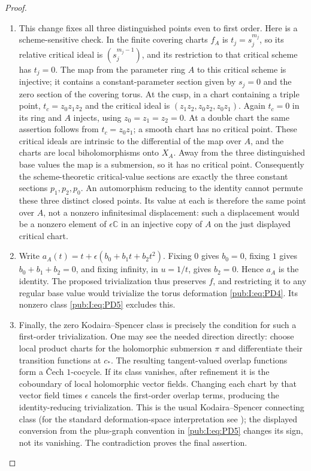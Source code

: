 \begin{proof}
\begin{enumerate}[label=\arabic*.,leftmargin=*]
\item This change fixes all three distinguished points even to first order.
Here is a scheme-sensitive check. In the finite covering charts
$f_A$ is $t_j=s_j^{m_j}$, so its relative critical ideal is
$(s_j^{m_j-1})$, and its restriction to that critical scheme has
$t_j=0$. The map from the parameter ring $A$ to this critical
scheme is injective; it contains a constant-parameter section given
by $s_j=0$ and the zero section of the covering torus.
At the cusp, in a chart containing a triple point,
$t_c=z_0z_1z_2$ and the critical ideal is
$(z_1z_2,z_0z_2,z_0z_1)$. Again $t_c=0$ in its ring and $A$ injects,
using $z_0=z_1=z_2=0$. At a double chart the same assertion follows
from $t_c=z_0z_1$; a smooth chart has no critical point.
These critical ideals are intrinsic to the differential of the map
over $A$, and the charts are local biholomorphisms onto $X_A$.
Away from the three distinguished base values the map is a
submersion, so it has no critical point.
Consequently the scheme-theoretic critical-value sections are exactly
the three constant sections $p_1,p_2,p_0$. An automorphism reducing
to the identity cannot permute these three distinct closed points.
Its value at each is therefore the same point over $A$, not a
nonzero infinitesimal displacement: such a displacement would be a
nonzero element of $\epsilon\mathbb C$ in an injective copy of $A$
on the just displayed critical chart.

\item Write $a_A(t)=t+\epsilon(b_0+b_1t+b_2t^2)$.
Fixing $0$ gives $b_0=0$, fixing $1$ gives $b_0+b_1+b_2=0$,
and fixing infinity, in $u=1/t$, gives $b_2=0$.
Hence $a_A$ is the identity. The proposed trivialization thus
preserves $f$, and restricting it to any regular base value would
trivialize the torus deformation \eqref{pub:I:eq:PD4}. Its nonzero class \eqref{pub:I:eq:PD5}
excludes this.

\item Finally, the zero Kodaira--Spencer class is precisely the condition for
such a first-order trivialization. One may see the needed direction
directly: choose local product charts for the holomorphic submersion
$\pi$ and differentiate their transition functions at $c_*$. The
resulting tangent-valued overlap functions form a \v Cech $1$-cocycle.
If its class vanishes, after refinement it is the coboundary of local
holomorphic vector fields. Changing each chart by that vector field
times $\epsilon$ cancels the first-order overlap terms, producing
the identity-reducing trivialization. This is the usual
Kodaira--Spencer connecting class (for the standard deformation-space
interpretation see \cite[Section~67, p.~15]{McMullen1996Complex});
the displayed conversion
from the plus-graph convention in \eqref{pub:I:eq:PD5} changes its sign, not its
vanishing. The contradiction proves the final assertion.
\end{enumerate}
\end{proof}